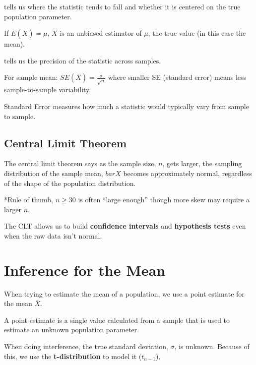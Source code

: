 \documentclass[
  letterpaper,
  DIV=11,
  numbers=noendperiod]{scrreprt}
\providecommand{\tightlist}{%
  \setlength{\itemsep}{0pt}\setlength{\parskip}{0pt}}
\begin{document}
\begin{description}
\tightlist
\item[Center]
tells us where the statistic tends to fall and whether it is centered on
the true population parameter.
\end{description}

If \(E(\bar X) = \mu\), \(\bar{X}\) is an unbiased estimator of \(\mu\),
the true value (in this case the mean).

\begin{description}
\tightlist
\item[Spread]
tells us the precision of the statistic across samples.
\end{description}

For sample mean: \(SE(\bar{X})=\frac{\sigma}{\sqrt{n}}\) where smaller
SE (standard error) means less sample-to-sample variability.

Standard Error measures how much a statistic would typically vary from
sample to sample.

\subsection{Central Limit Theorem}\label{central-limit-theorem}

The central limit theorem says as the sample size, \(n\), gets larger,
the sampling distribution of the sample mean, \(bar{X}\) becomes
approximately normal, regardless of the shape of the population
distribution.

*Rule of thumb, \(n \geq 30\) is often ``large enough'' though more skew
may require a larger \(n\).

The CLT allows us to build \textbf{confidence intervals} and
\textbf{hypothesis tests} even when the raw data isn't normal.

\section{Inference for the Mean}\label{inference-for-the-mean}

When trying to estimate the mean of a population, we use a point
estimate for the mean \(\bar{X}\).

A point estimate is a single value calculated from a sample that is used
to estimate an unknown population parameter.

When doing interference, the true standard deviation, \(\sigma\), is
unknown. Because of this, we use the \textbf{t-distribution} to model it
(\(t_{n-1}\)).
\end{document}
